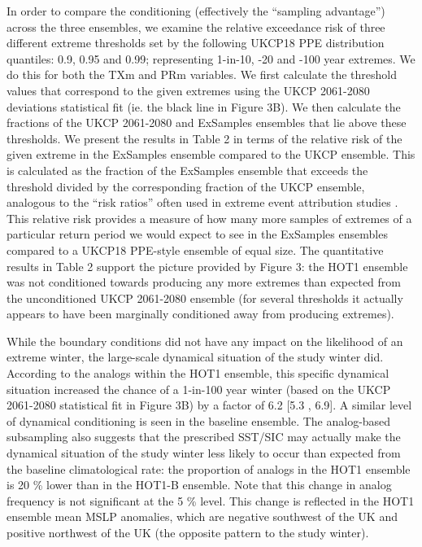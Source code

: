       In order to compare the conditioning (effectively the ``sampling advantage'') across the three ensembles, we examine the relative exceedance risk of three different extreme thresholds set by the following UKCP18 PPE distribution quantiles: 0.9, 0.95 and 0.99; representing 1-in-10, -20 and -100 year extremes. We do this for both the TXm and PRm variables. We first calculate the threshold values that correspond to the given extremes using the UKCP 2061-2080 deviations statistical fit (ie. the black line in Figure 3B). We then calculate the fractions of the UKCP 2061-2080 and ExSamples ensembles that lie above these thresholds. We present the results in Table 2 in terms of the relative risk of the given extreme in the ExSamples ensemble compared to the UKCP ensemble. This is calculated as the fraction of the ExSamples ensemble that exceeds the threshold divided by the corresponding fraction of the UKCP ensemble, analogous to the ``risk ratios'' often used in extreme event attribution studies \citep{stone_end--end_2005,stott_human_2004}. This relative risk provides a measure of how many more samples of extremes of a particular return period we would expect to see in the ExSamples ensembles compared to a UKCP18 PPE-style ensemble of equal size. The quantitative results in Table 2 support the picture provided by Figure 3: the HOT1 ensemble was not conditioned towards producing any more extremes than expected from the unconditioned UKCP 2061-2080 ensemble (for several thresholds it actually appears to have been marginally conditioned away from producing extremes).
      
      While the boundary conditions did not have any impact on the likelihood of an extreme winter, the large-scale dynamical situation of the study winter did. According to the analogs within the HOT1 ensemble, this specific dynamical situation increased the chance of a 1-in-100 year winter (based on the UKCP 2061-2080 statistical fit in Figure 3B) by a factor of 6.2 [5.3 , 6.9]. A similar level of dynamical conditioning is seen in the baseline ensemble. The analog-based subsampling also suggests that the prescribed SST/SIC may actually make the dynamical situation of the study winter less likely to occur than expected from the baseline climatological rate: the proportion of analogs in the HOT1 ensemble is 20 \% lower than in the HOT1-B ensemble. Note that this change in analog frequency is not significant at the 5 \% level. This change is reflected in the HOT1 ensemble mean MSLP anomalies, which are negative southwest of the UK and positive northwest of the UK (the opposite pattern to the study winter).

